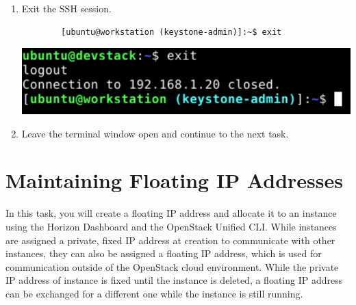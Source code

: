 \documentclass[letterpaper, 12pt]{article}
\begin{document}
\begin{enumerate}
    \item Exit the SSH session.
    \begin{lstlisting}
        [ubuntu@workstation (keystone-admin)]:~$ exit
    \end{lstlisting}

    \begin{center}
        \includegraphics[width=\linewidth]{images/part2/step18.png}
    \end{center}

    \item Leave the terminal window open and continue to the next task.

\end{enumerate}

\section{Maintaining Floating IP Addresses}
\label{sec:maintaining_floating_ip_addresses}
In this task, you will create a floating IP address and allocate it to an instance using the Horizon Dashboard and the
OpenStack Unified CLI. While instances are assigned a private, fixed IP address at creation to communicate with other
instances, they can also be assigned a floating IP address, which is used for communication outside of the OpenStack
cloud environment. While the private IP address of instance is fixed until the instance is deleted, a floating IP
address can be exchanged for a different one while the instance is still running.
\end{document}
